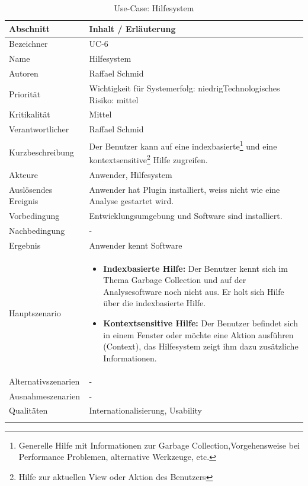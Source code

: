 \begin{longtable}{|p{4cm}|p{10.5cm}|}
\hline
   \textbf{Abschnitt} & \textbf{Inhalt / Erläuterung} \\\hline
   Bezeichner & UC-6\\\hline
   Name & Hilfesystem\\\hline
   Autoren & Raffael Schmid\\\hline
   Priorität & Wichtigkeit für Systemerfolg: niedrig\newline Technologisches Risiko: mittel\\\hline
   Kritikalität & Mittel\\\hline
   Verantwortlicher & Raffael Schmid\\\hline
   Kurzbeschreibung & Der Benutzer kann auf eine indexbasierte\footnote{Generelle Hilfe mit Informationen zur Garbage Collection,Vorgehensweise bei Performance Problemen, alternative Werkzeuge, etc.} und eine kontextsensitive\footnote{Hilfe zur aktuellen View oder Aktion des Benutzers} Hilfe zugreifen. \\\hline
   Akteure & Anwender, Hilfesystem\\\hline
   Auslösendes Ereignis & Anwender hat Plugin installiert, weiss nicht wie eine Analyse gestartet wird.\\\hline
   Vorbedingung & Entwicklungsumgebung und Software sind installiert.\\\hline
   Nachbedingung & -\\\hline
   Ergebnis & Anwender kennt Software\\\hline
   Hauptszenario &	\begin{itemize}
		\item \textbf{Indexbasierte Hilfe: } Der Benutzer kennt sich im Thema Garbage Collection und auf der Analysesoftware noch nicht aus. Er holt sich Hilfe über die indexbasierte Hilfe. 
		\item \textbf{Kontextsensitive Hilfe: } Der Benutzer befindet sich in einem Fenster oder möchte eine Aktion ausführen (Context), das Hilfesystem zeigt ihm dazu zusätzliche Informationen.
	\end{itemize}
	\\\hline
   Alternativszenarien & -\\\hline
   Ausnahmeszenarien & -\\\hline
   Qualitäten & Internationalisierung, Usability\\\hline
\caption{Use-Case: Hilfesystem}
\end{longtable}

